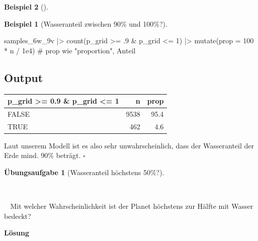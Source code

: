 \documentclass[
  ngerman,
  letterpaper,
  twoside,
  open=any]{scrbook}
\newenvironment{Shaded}{\begin{snugshade}}{\end{snugshade}}
\newcommand{\AttributeTok}[1]{\textcolor[rgb]{0.40,0.45,0.13}{#1}}
\newcommand{\CommentTok}[1]{\textcolor[rgb]{0.37,0.37,0.37}{#1}}
\newcommand{\DecValTok}[1]{\textcolor[rgb]{0.68,0.00,0.00}{#1}}
\newcommand{\FloatTok}[1]{\textcolor[rgb]{0.68,0.00,0.00}{#1}}
\newcommand{\FunctionTok}[1]{\textcolor[rgb]{0.28,0.35,0.67}{#1}}
\newcommand{\NormalTok}[1]{\textcolor[rgb]{0.00,0.23,0.31}{#1}}
\newcommand{\SpecialCharTok}[1]{\textcolor[rgb]{0.37,0.37,0.37}{#1}}
\newcounter{none} %
\theoremstyle{definition}
\newtheorem{example}{Beispiel}[chapter]
\theoremstyle{plain}
\theoremstyle{definition}
\newtheorem{exercise}{Übungsaufgabe}[chapter]
\theoremstyle{definition}
\theoremstyle{remark}
\begin{document}
\begin{example}[]
\begin{example}[Wasseranteil zwischen 90\% und
100\%?]
\begin{Shaded}
\begin{Highlighting}[]
\NormalTok{samples\_6w\_9v }\SpecialCharTok{|\textgreater{}}
  \FunctionTok{count}\NormalTok{(p\_grid }\SpecialCharTok{\textgreater{}=}\NormalTok{ .}\DecValTok{9} \SpecialCharTok{\&}\NormalTok{ p\_grid }\SpecialCharTok{\textless{}=} \DecValTok{1}\NormalTok{) }\SpecialCharTok{|\textgreater{}}
  \FunctionTok{mutate}\NormalTok{(}\AttributeTok{prop =} \DecValTok{100} \SpecialCharTok{*}\NormalTok{ n }\SpecialCharTok{/} \FloatTok{1e4}\NormalTok{)  }\CommentTok{\# prop wie "proportion", Anteil}
\end{Highlighting}
\end{Shaded}

\subsection{Output}

{\def\LTcaptype{none} %
\begin{longtable}[]{@{}lrr@{}}
\toprule\noalign{}
p\_grid \textgreater= 0.9 \& p\_grid \textless= 1 & n & prop \\
\midrule\noalign{}
\endhead
\bottomrule\noalign{}
\endlastfoot
FALSE & 9538 & 95.4 \\
TRUE & 462 & 4.6 \\
\end{longtable}
}

Laut unserem Modell ist es also sehr unwahrscheinlich, dass der
Wasseranteil der Erde mind. 90\% beträgt. \(\square\)

\end{example}

\begin{exercise}[Wasseranteil höchstens
50\%?]\protect\hypertarget{exr-wasser50}{}\label{exr-wasser50}

~

\begin{displayquote}
👩🔬 Mit welcher Wahrscheinlichkeit ist der Planet höchstens zur Hälfte
mit Wasser bedeckt?
\end{displayquote}

\begin{tcolorbox}[enhanced jigsaw, arc=.35mm, bottomrule=.15mm, breakable, colback=white, colframe=quarto-callout-tip-color-frame, left=2mm, leftrule=.75mm, opacityback=0, rightrule=.15mm, toprule=.15mm]

\vspace{-3mm}\textbf{Lösung}\vspace{3mm}


\end{tcolorbox}
\end{exercise}
\end{example}
\end{document}
